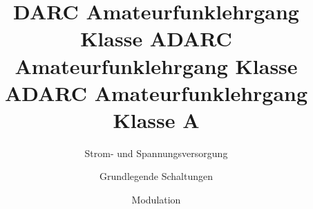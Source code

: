 \documentclass[aspectratio = 169]{beamer}
\begin{document}
\title{DARC Amateurfunklehrgang Klasse A}
\author{Strom- und Spannungsversorgung}
\begin{frame}
\maketitle
\end{frame}













\title{DARC Amateurfunklehrgang Klasse A}
\author{Grundlegende Schaltungen}
\begin{frame}
\maketitle
\end{frame}



















\title{DARC Amateurfunklehrgang Klasse A}
\author{Modulation}
\begin{frame}
\maketitle
\end{frame}






\end{document}
